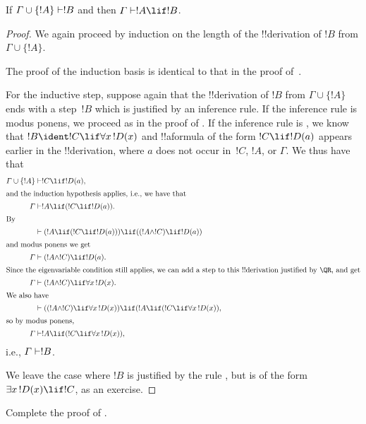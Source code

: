 \documentclass[../../../include/open-logic-section]{subfiles}
\begin{document}


\begin{thm}
 If $\Gamma \cup \{!A\} \Proves !B$ and
then $\Gamma \Proves !A \lif !B$.
\end{thm}

\begin{proof}
We again proceed by induction on the length
of the !!{derivation} of $!B$ from $\Gamma \cup \{!A\}$.

The proof of the induction basis is identical to that in the proof
of~.

For the inductive step, suppose again that the !!{derivation} of $!B$
from $\Gamma \cup \{!A\}$ ends with a step~$!B$ which is justified by
an inference rule. If the inference rule is modus ponens, we proceed
as in the proof of . If the inference
rule is \QR, we know that $!B \ident !C \lif \lforall[x][!D(x)]$ and
!!a{formula} of the form $!C \lif !D(a)$ appears earlier in the
!!{derivation}, where $a$ does not occur in~$!C$, $!A$, or $\Gamma$. We
thus have that
\begin{align*}
  \Gamma \cup \{!A\} & \Proves !C \lif !D(a),\\
  \intertext{and the induction hypothesis applies, i.e., we have that}
    \Gamma & \Proves !A \lif (!C \lif !D(a)).\\
  \intertext{By}
  & \Proves (!A \lif (!C \lif !D(a))) \lif ((!A \land !C) \lif !D(a))\\
  \intertext{and modus ponens we get}
  \Gamma & \Proves (!A \land !C) \lif !D(a).\\
  \intertext{Since the eigenvariable condition still applies, we can add a step to this !!{derivation} justified by \QR, and get}
    \Gamma & \Proves (!A \land !C) \lif \lforall[x][!D(x)].\\
    \intertext{We also have}
    & \Proves ((!A \land !C) \lif \lforall[x][!D(x)]) \lif (!A \lif (!C \lif \lforall[x][!D(x)]),\\
    \intertext{so by modus ponens,}
    \Gamma & \Proves !A \lif (!C \lif \lforall[x][!D(x)]),
\end{align*}
i.e., $\Gamma \Proves !B$.

We leave the case where $!B$ is justified by the rule \QR, but is of
the form $\lexists[x][!D(x)] \lif !C$, as an exercise.
\end{proof}

\begin{prob}
  Complete the proof of .
\end{prob}
\end{document}
